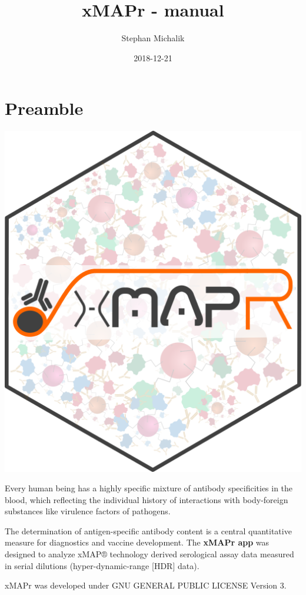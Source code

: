 \documentclass[]{book}
\title{xMAPr - manual}
\author{Stephan Michalik}
\date{2018-12-21}
\theoremstyle{definition}
\theoremstyle{definition}
\theoremstyle{definition}
\theoremstyle{remark}
\begin{document}
\maketitle

{
\setcounter{tocdepth}{1}
\tableofcontents
}
\chapter{Preamble}\label{preamble}

\includegraphics[width=7.07in]{figures/xMAPr_logo_mod_hexbin}

Every human being has a highly specific mixture of antibody
specificities in the blood, which reflecting the individual history of
interactions with body-foreign substances like virulence factors of
pathogens.

The determination of antigen-specific antibody content is a central
quantitative measure for diagnostics and vaccine development. The
\textbf{xMAPr app} was designed to analyze xMAP® technology derived
serological assay data measured in serial dilutions (hyper-dynamic-range
{[}HDR{]} data).

xMAPr was developed under GNU GENERAL PUBLIC LICENSE Version 3.
\end{document}
